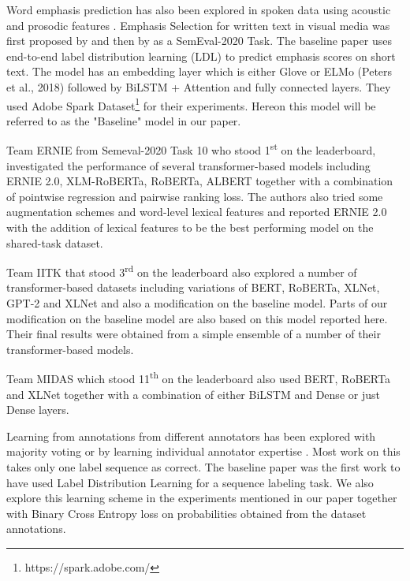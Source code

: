 \documentclass[letterpaper]{article}
\begin{document}
Word emphasis prediction has also been explored in spoken data using acoustic and prosodic features \citep{mishra2012word,chen2017automatic}. Emphasis Selection for written text in visual media was first proposed by \citet{shirani2019learning} and then by \citet{shirani2020let} as a SemEval-2020 Task. The baseline paper \citep{shirani2019learning} uses end-to-end label distribution learning (LDL) to predict emphasis scores on short text. The model has an embedding layer which is either Glove  \citep{pennington2014glove}  or ELMo (Peters et al., 2018) followed by BiLSTM + Attention and fully connected layers. They used Adobe Spark Dataset\footnote{https://spark.adobe.com/} for their experiments. Hereon this model will be referred to as the "Baseline" model in our paper.

Team ERNIE \citep{huang2020ernie} from Semeval-2020 Task 10 who stood 1\textsuperscript{\rm st} on the leaderboard, investigated the performance of several transformer-based models including ERNIE 2.0, XLM-RoBERTa, RoBERTa, ALBERT together with a combination of pointwise regression and pairwise ranking loss. The authors also tried some augmentation schemes and word-level lexical features and reported ERNIE 2.0 with the addition of lexical features to be the best performing model on the shared-task dataset.

Team IITK \citep{singhal2020iitk} that stood 3\textsuperscript{\rm rd} on the leaderboard also explored a number of transformer-based datasets including variations of BERT, RoBERTa, XLNet, GPT-2 and XLNet and also a modification on the baseline model. Parts of our modification on the baseline model are also based on this model reported here. Their final results were obtained from a simple ensemble of a number of their transformer-based models.

Team MIDAS \citep{anand2020midas} which stood 11\textsuperscript{\rm th} on the leaderboard also used BERT, RoBERTa and XLNet together with a combination of either BiLSTM and Dense or just Dense layers.

Learning from annotations from different annotators has been explored with majority voting \citep{laws2011active} or by learning individual annotator expertise \citep{10.1145/3178876.3186033,rodrigues2017deep,Rodrigues2013SequenceLW}. Most work on this takes only one label sequence as correct. The baseline paper \citep{shirani2019learning}  was the first work to have used Label Distribution Learning \citep{geng2016label} for a sequence labeling task. We also explore this learning scheme in the experiments mentioned in our paper together with Binary Cross Entropy loss on probabilities obtained from the dataset annotations.
\end{document}
